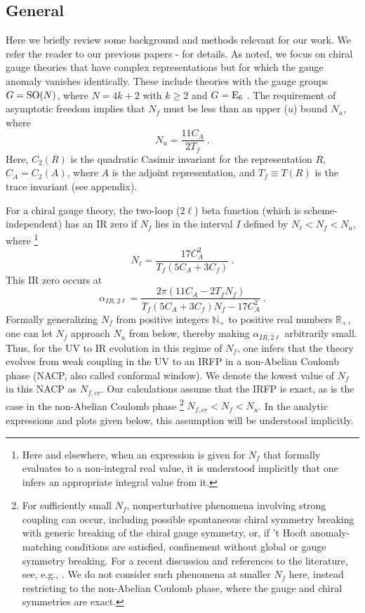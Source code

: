 \documentclass[prd,twocolumn,nofootinbib,amsfonts,amssymb]{revtex4}
\newcommand{\beq}{\begin{equation}}
\newcommand{\eeq}{\end{equation}}
\begin{document}
\subsection{General}

Here we briefly review some background and methods relevant for our work.  We
refer the reader to our previous papers \cite{gtr}-\cite{dexo} for details. As
noted, we focus on chiral gauge theories that have complex representations
but for which the gauge anomaly vanishes identically.  These include theories
with the gauge groups $G={\rm SO}(N)$, where $N=4k+2$ with $k \ge 2$ and
$G={\rm E}_6$ \cite{gg,gp}.  The requirement of asymptotic freedom implies that
$N_f$ must be less than an upper ($u$) bound $N_u$, where
%
\beq
N_u = \frac{11C_A}{2T_f} \ .
\label{nfb1z}
\eeq
%
Here, $C_2(R)$ is the quadratic Casimir invariant for the representation $R$,
$C_A=C_2(A)$, where $A$ is the adjoint representation, and 
$T_f \equiv T(R)$ is the trace invariant (see appendix). 


For a chiral gauge theory, the two-loop ($2\ell$) beta function (which is
scheme-independent) has an IR zero if $N_f$ lies in the interval $I$ defined by
$N_{\ell} < N_f < N_u$, where \footnote{
Here and elsewhere, when an expression is given for $N_f$
that formally evaluates to a non-integral real value, it is understood
implicitly that one infers an appropriate integral value from it.} 
%
\beq
N_{\ell} = \frac{17C_A^2}{T_f(5C_A+3C_f)} \ .
\label{nfb2z}
\eeq
%
This IR zero occurs at
%
\beq
\alpha_{IR,2\ell} = \frac{2\pi (11C_A-2T_fN_f)}{T_f(5C_A+3C_f)N_f-17C_A^2}  \ .
\label{alfir_2loop}
\eeq
%
Formally generalizing $N_f$ from positive integers ${\mathbb N}_+$ to positive
real numbers ${\mathbb R}_+$, one can let $N_f$ approach $N_u$ from below,
thereby making $\alpha_{IR,2\ell}$ arbitrarily small. Thus, for the UV to IR
evolution in this regime of $N_f$, one infers that the theory evolves from weak
coupling in the UV to an IRFP in a non-Abelian Coulomb phase (NACP, also called
conformal window).  We denote the lowest value of $N_f$ in this NACP as
$N_{f,cr}$. Our calculations assume that the IRFP is exact, as is the case in
the non-Abelian Coulomb phase \footnote{ For sufficiently small $N_f$,
  nonperturbative phenomena involving strong coupling can occur, including
  possible spontaneous chiral symmetry breaking with generic breaking of the
  chiral gauge symmetry, or, if 't Hooft anomaly-matching conditions are
  satisfied, confinement without global or gauge symmetry breaking. For a
  recent discussion and references to the literature, see, e.g., \cite{cgt}.
  We do not consider such phenomena at smaller $N_f$ here, instead restricting
  to the non-Abelian Coulomb phase, where the gauge and chiral symmetries are
  exact.}  $N_{f,cr} < N_f < N_u$.  In the analytic expressions and plots given
below, this assumption will be understood implicitly.
\end{document}
